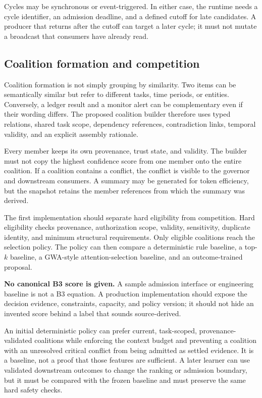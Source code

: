 Cycles may be synchronous or event-triggered. In either case, the runtime needs a cycle identifier, an admission deadline, and a defined cutoff for late candidates. A producer that returns after the cutoff can target a later cycle; it must not mutate a broadcast that consumers have already read.

\subsection{Coalition formation and competition}

Coalition formation is not simply grouping by similarity. Two items can be semantically similar but refer to different tasks, time periods, or entities. Conversely, a ledger result and a monitor alert can be complementary even if their wording differs. The proposed coalition builder therefore uses typed relations, shared task scope, dependency references, contradiction links, temporal validity, and an explicit assembly rationale.

Every member keeps its own provenance, trust state, and validity. The builder must not copy the highest confidence score from one member onto the entire coalition. If a coalition contains a conflict, the conflict is visible to the governor and downstream consumers. A summary may be generated for token efficiency, but the snapshot retains the member references from which the summary was derived.

The first implementation should separate hard eligibility from competition. Hard eligibility checks provenance, authorization scope, validity, sensitivity, duplicate identity, and minimum structural requirements. Only eligible coalitions reach the selection policy. The policy can then compare a deterministic rule baseline, a top-$k$ baseline, a GWA-style attention-selection baseline, and an outcome-trained proposal.

\begin{notebox}
\textbf{No canonical B3 score is given.} A sample admission interface or engineering baseline is not a B3 equation. A production implementation should expose the decision evidence, constraints, capacity, and policy version; it should not hide an invented score behind a label that sounds source-derived.
\end{notebox}

An initial deterministic policy can prefer current, task-scoped, provenance-validated coalitions while enforcing the context budget and preventing a coalition with an unresolved critical conflict from being admitted as settled evidence. It is a baseline, not a proof that those features are sufficient. A later learner can use validated downstream outcomes to change the ranking or admission boundary, but it must be compared with the frozen baseline and must preserve the same hard safety checks.

